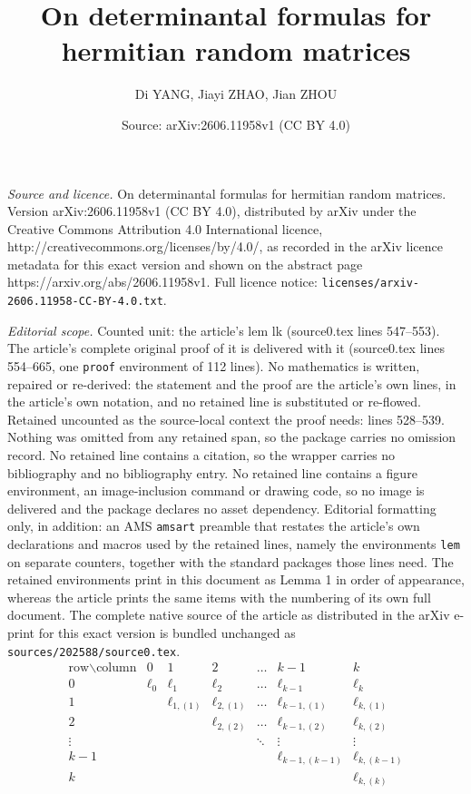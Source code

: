 \documentclass[10pt,a4paper]{amsart}
\title{On determinantal formulas for hermitian random matrices}
\author{Di YANG, Jiayi ZHAO, Jian ZHOU}
\date{Source: arXiv:2606.11958v1 (CC BY 4.0)}
\begin{document}
\maketitle

\noindent\emph{Source and licence.} On determinantal formulas for hermitian random matrices. Version arXiv:2606.11958v1 (CC BY 4.0), distributed by arXiv under the Creative Commons Attribution 4.0 International licence, http://creativecommons.org/licenses/by/4.0/, as recorded in the arXiv licence metadata for this exact version and shown on the abstract page https://arxiv.org/abs/2606.11958v1. Full licence notice: \texttt{licenses/arxiv-2606.11958-CC-BY-4.0.txt}.\par\smallskip

\noindent\textit{Editorial scope.} Counted unit: the article's lem lk (source0.tex lines 547--553). The article's complete original proof of it is delivered with it (source0.tex lines 554--665, one \texttt{proof} environment of 112 lines). No mathematics is written, repaired or re-derived: the statement and the proof are the article's own lines, in the article's own notation, and no retained line is substituted or re-flowed.  Retained uncounted as the source-local context the proof needs: lines 528--539.  Nothing was omitted from any retained span, so the package carries no omission record.  No retained line contains a citation, so the wrapper carries no bibliography and no bibliography entry.  No retained line contains a figure environment, an image-inclusion command or drawing code, so no image is delivered and the package declares no asset dependency.  Editorial formatting only, in addition: an AMS \texttt{amsart} preamble that restates the article's own declarations and macros used by the retained lines, namely the environments \texttt{lem} on separate counters, together with the standard packages those lines need.  The retained environments print in this document as Lemma 1 in order of appearance, whereas the article prints the same items with the numbering of its own full document.  The complete native source of the article as distributed in the arXiv e-print for this exact version is bundled unchanged as \texttt{sources/202588/source0.tex}.
	\begin{equation} \label{table}
		\begin{array}{c|cccccc}
			\text{row}\backslash\text{column} & 0 & 1 & 2 & \dots & k-1 & k \\
			\hline
			0 & \ell_0 & \ell_1 & \ell_2 & \dots & \ell_{k-1} & \ell_k \\
			1 & & \ell_{1,(1)} & \ell_{2,(1)} & \dots & \ell_{k-1,(1)} & \ell_{k,(1)} \\
			2 & & & \ell_{2,(2)} & \dots & \ell_{k-1,(2)} & \ell_{k,(2)} \\
			\vdots & & & & \ddots & \vdots & \vdots \\
			k-1 & & & & & \ell_{k-1,(k-1)} & \ell_{k,(k-1)} \\
			k & & & & & & \ell_{k,(k)}
		\end{array}
	\end{equation} 
\end{document}
